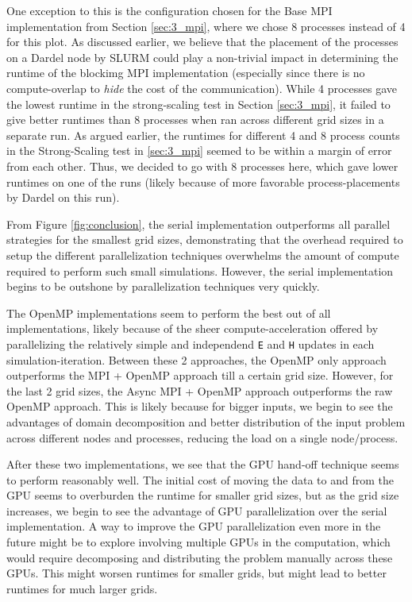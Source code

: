 \documentclass[a4paper,10pt]{article}
\begin{document}
\begin{multicols}{2}
One exception to this is the configuration chosen for the Base MPI implementation from Section \ref{sec:3_mpi}, where we chose 8 processes instead of 4 for this plot. As discussed earlier, we believe that the placement of the processes on a Dardel node by SLURM could play a non-trivial impact in determining the runtime of the blockimg MPI implementation (especially since there is no compute-overlap to \textit{hide} the cost of the communication). While 4 processes gave the lowest runtime in the strong-scaling test in Section \ref{sec:3_mpi}, it failed to give better runtimes than 8 processes when ran across different grid sizes in a separate run. As argued earlier, the runtimes for different 4 and 8 process counts in the Strong-Scaling test in \ref{sec:3_mpi} seemed to be within a margin of error from each other. Thus, we decided to go with 8 processes here, which gave lower runtimes on one of the runs (likely because of more favorable process-placements by Dardel on this run). 

From Figure \ref{fig:conclusion}, the serial implementation outperforms all parallel strategies for the smallest grid sizes, demonstrating that the overhead required to setup the different parallelization techniques overwhelms the amount of compute required to perform such small simulations. However, the serial implementation begins to be outshone by parallelization techniques very quickly.

The OpenMP implementations seem to perform the best out of all implementations, likely because of the sheer compute-acceleration offered by parallelizing the relatively simple and independend \verb|E| and \verb|H| updates in each simulation-iteration. Between these 2 approaches, the OpenMP only approach outperforms the MPI + OpenMP approach till a certain grid size. However, for the last 2 grid sizes, the Async MPI + OpenMP approach outperforms the raw OpenMP approach. This is likely because for bigger inputs, we begin to see the advantages of domain decomposition and better distribution of the input problem across different nodes and processes, reducing the load on a single node/process.

After these two implementations, we see that the GPU hand-off technique seems to perform reasonably well. The initial cost of moving the data to and from the GPU seems to overburden the runtime for smaller grid sizes, but as the grid size increases, we begin to see the advantage of GPU parallelization over the serial implementation. A way to improve the GPU parallelization even more in the future might be to explore involving multiple GPUs in the computation, which would require decomposing and distributing the problem manually across these GPUs. This might worsen runtimes for smaller grids, but might lead to better runtimes for much larger grids. 


\end{multicols}
\end{document}
